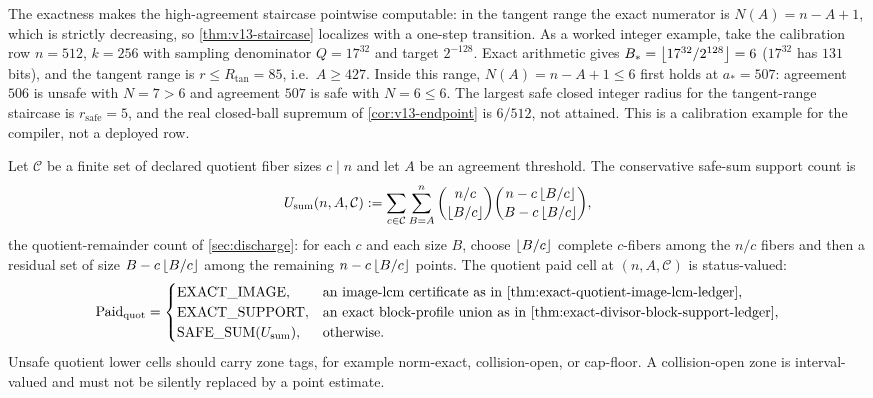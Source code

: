 \begin{remark}\label{rem:v13-tangent-calibration}
The exactness makes the high-agreement staircase pointwise computable: in the tangent range the exact numerator is $N(A)=n-A+1$, which is strictly decreasing, so \cref{thm:v13-staircase} localizes with a one-step transition.  As a worked integer example, take the calibration row $n=512$, $k=256$ with sampling denominator $Q=17^{32}$ and target $2^{-128}$.  Exact arithmetic gives $B_*=\left\lfloor 17^{32}/2^{128}\right\rfloor=6$ \textup($17^{32}$ has $131$ bits\textup), and the tangent range is $r\le R_{\tan}=85$, i.e.\ $A\ge427$.  Inside this range, $N(A)=n-A+1\le6$ first holds at $a_*=507$: agreement $506$ is unsafe with $N=7>6$ and agreement $507$ is safe with $N=6\le6$.  The largest safe closed integer radius for the tangent-range staircase is $r_{\mathrm{safe}}=5$, and the real closed-ball supremum of \cref{cor:v13-endpoint} is $6/512$, not attained.  This is a calibration example for the compiler, not a deployed row.
\end{remark}

\begin{definition}\label{def:v13-quotient-status}
Let $\mathcal C$ be a finite set of declared quotient fiber sizes $c\mid n$ and let $A$ be an agreement threshold.  The conservative safe-sum support count is
\[
U_{\mathrm{sum}}(n,A,\mathcal C):=
\sum_{c\in\mathcal C}\sum_{B=A}^{n}
\binom{n/c}{\left\lfloor B/c\right\rfloor}
\binom{n-c\left\lfloor B/c\right\rfloor}{B-c\left\lfloor B/c\right\rfloor},
\]
the quotient-remainder count of \cref{sec:discharge}: for each $c$ and each size $B$, choose $\left\lfloor B/c\right\rfloor$ complete $c$-fibers among the $n/c$ fibers and then a residual set of size $B-c\left\lfloor B/c\right\rfloor$ among the remaining $n-c\left\lfloor B/c\right\rfloor$ points.  The quotient paid cell at $(n,A,\mathcal C)$ is status-valued:
\[
\Paid_{\mathrm{quot}}=
\begin{cases}
\mathrm{EXACT\_IMAGE}, & \text{an image-lcm certificate as in \cref{thm:exact-quotient-image-lcm-ledger}},\\
\mathrm{EXACT\_SUPPORT}, & \text{an exact block-profile union as in \cref{thm:exact-divisor-block-support-ledger}},\\
\mathrm{SAFE\_SUM}(U_{\mathrm{sum}}), & \text{otherwise}.
\end{cases}
\]
Unsafe quotient lower cells should carry zone tags, for example norm-exact, collision-open, or cap-floor.  A collision-open zone is interval-valued and must not be silently replaced by a point estimate.
\end{definition}

